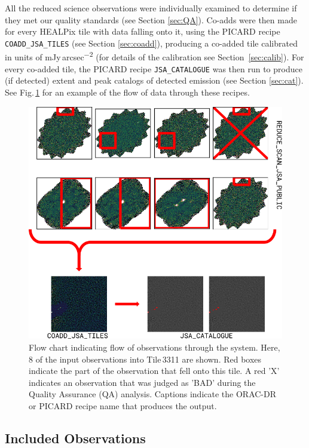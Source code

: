 \documentclass[twocolumn,times]{aastex6}
\newcommand{\jyas}{Jy\,arcsec\textsuperscript{$-$2}}
\begin{document}
All the reduced science observations were individually examined to
determine if they met our quality standards (see Section
\ref{sec:QA}). Co-adds were then made for every HEALPix tile with data
falling onto it, using the PICARD recipe \texttt{COADD\_JSA\_TILES}
(see Section \ref{sec:coadd}), producing a co-added tile calibrated in
units of m\jyas{} (for details of the calibration see
Section~\ref{sec:calib}). For every co-added tile, the PICARD recipe
\texttt{JSA\_CATALOGUE} was then run to produce (if detected) extent
and peak catalogs of detected emission (see Section
\ref{sec:cat}). See Fig.\,\ref{fig:flowchart} for an example of
the flow of data through these recipes.

\begin{figure}
  \centering
  \includegraphics[width=1.0\linewidth]{flowchart}
  \caption{Flow chart indicating flow of observations through the
    system. Here, 8 of the input observations into Tile\,3311 are
    shown. Red boxes indicate the part of the observation that fell
    onto this tile. A red 'X' indicates an observation that was judged
    as 'BAD' during the Quality Assurance (QA) analysis. Captions
    indicate the ORAC-DR or PICARD recipe name that produces the output.}
  \label{fig:flowchart}
\end{figure}

\subsection{Included Observations}
\end{document}
